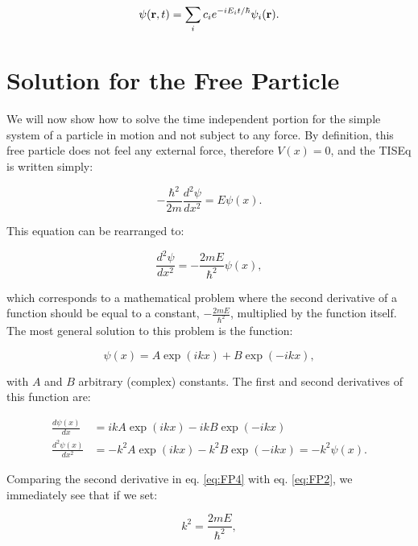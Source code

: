 \documentclass[
  english,
  9pt,
]{extbook}
\theoremstyle{definition}
\theoremstyle{definition}
\theoremstyle{definition}
\theoremstyle{definition}
\theoremstyle{remark}
\begin{document}
\begin{equation}
\psi({\bf r}, t) = \sum_i c_i e^{-iE_it / \hbar} \psi_i({\bf r}).
\end{equation}

\section{Solution for the Free Particle}\label{solution-for-the-free-particle}

We will now show how to solve the time independent portion for the simple system of a particle in motion and not subject to any force. By definition, this free particle does not feel any external force, therefore \(V(x)=0\), and the TISEq is written simply:

\begin{equation}
- \frac{\hbar^2}{2m} \frac{d^2\psi}{dx^2} = E \psi(x).
\label{eq:FP1}
\end{equation}

This equation can be rearranged to:

\begin{equation}
\frac{d^2\psi}{dx^2} =- \frac{2mE}{\hbar^2} \psi(x),
\label{eq:FP2}
\end{equation}

which corresponds to a mathematical problem where the second derivative of a function should be equal to a constant, \(- \frac{2mE}{\hbar^2}\), multiplied by the function itself. The most general solution to this problem is the function:

\begin{equation}
\psi(x) = A \exp(ikx)+B \exp(-ikx),
\label{eq:FP3}
\end{equation}

with \(A\) and \(B\) arbitrary (complex) constants. The first and second derivatives of this function are:

\begin{equation}
\begin{aligned}
\frac{d \psi(x)}{dx} &= ik A \exp(ikx) - ikB\exp(-ikx) \\
\frac{d^2 \psi(x)}{dx^2} &= -k^2 A\exp(ikx) -k^2 B\exp(-ikx) = -k^2 \psi(x).
\end{aligned}
\label{eq:FP4}
\end{equation}

Comparing the second derivative in eq. \eqref{eq:FP4} with eq. \eqref{eq:FP2}, we immediately see that if we set:

\begin{equation}
k^2 = \frac{2mE}{\hbar^2},
\label{eq:FP5}
\end{equation}
\end{document}
